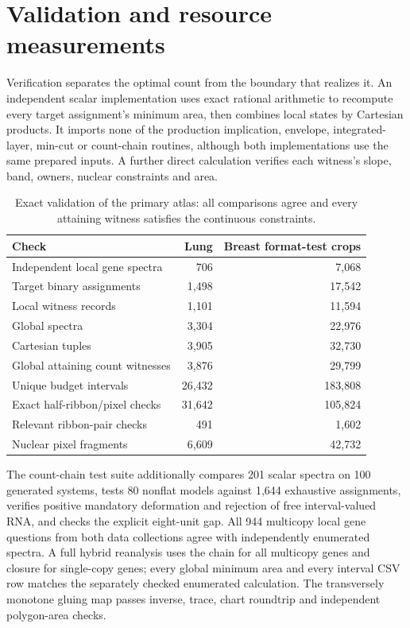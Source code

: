 \documentclass[10pt,letterpaper]{article}
\begin{document}
\FloatBarrier
\section{Validation and resource measurements}
Verification separates the optimal count from the boundary that realizes it. An independent scalar implementation uses exact rational arithmetic to recompute every target assignment's minimum area, then combines local states by Cartesian products. It imports none of the production implication, envelope, integrated-layer, min-cut or count-chain routines, although both implementations use the same prepared inputs. A further direct calculation verifies each witness's slope, band, owners, nuclear constraints and area.

\begin{table}[ht]\centering
\begin{tabular}{lrr}\toprule
Check&Lung&Breast format-test crops\\\midrule
Independent local gene spectra&706&7,068\\
Target binary assignments&1,498&17,542\\
Local witness records&1,101&11,594\\
Global spectra&3,304&22,976\\
Cartesian tuples&3,905&32,730\\
Global attaining count witnesses&3,876&29,799\\
Unique budget intervals&26,432&183,808\\
Exact half-ribbon/pixel checks&31,642&105,824\\
Relevant ribbon-pair checks&491&1,602\\
Nuclear pixel fragments&6,609&42,732\\\bottomrule
\end{tabular}
\caption{Exact validation of the primary atlas: all comparisons agree and every attaining witness satisfies the continuous constraints.}
\end{table}

The count-chain test suite additionally compares 201 scalar spectra on 100 generated systems, tests 80 nonflat models against 1,644 exhaustive assignments, verifies positive mandatory deformation and rejection of free interval-valued RNA, and checks the explicit eight-unit gap. All 944 multicopy local gene questions from both data collections agree with independently enumerated spectra. A full hybrid reanalysis uses the chain for all multicopy genes and closure for single-copy genes; every global minimum area and every interval CSV row matches the separately checked enumerated calculation. The transversely monotone gluing map passes inverse, trace, chart roundtrip and independent polygon-area checks.
\end{document}
